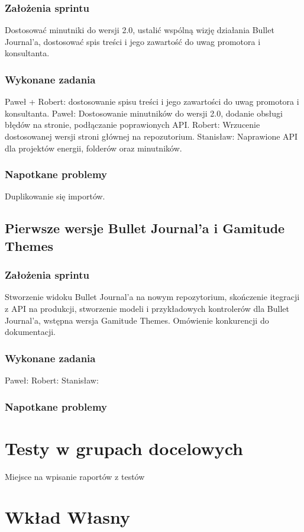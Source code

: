 \documentclass[a4paper,11pt]{report}
\begin{document}
\subsection {Założenia sprintu}
Dostosować minutniki do wersji 2.0, ustalić wspólną wizję działania Bullet Journal'a, dostosować spis treści i jego zawartość do uwag promotora i konsultanta.
\subsection {Wykonane zadania}
Paweł + Robert: dostosowanie spisu treści i jego zawartości do uwag promotora i konsultanta.
Paweł: Dostosowanie minutników do wersji 2.0, dodanie obsługi błędów na stronie, podłączanie poprawionych API.
Robert:  Wrzucenie dostosowanej wersji stroni głównej na repozutorium.
Stanisław: Naprawione API dla projektów energii, folderów oraz minutników.
\subsection {Napotkane problemy}
Duplikowanie się importów.

\section {Pierwsze wersje Bullet Journal'a i Gamitude Themes}
\subsection {Założenia sprintu}
Stworzenie widoku Bullet Journal'a na nowym repozytorium, skończenie itegracji z API na produkcji, stworzenie modeli i przykładowych kontrolerów dla Bullet Journal'a, wstępna wersja Gamitude Themes. Omówienie konkurencji do dokumentacji.
\subsection {Wykonane zadania}
Paweł: 
Robert: 
Stanisław:
\subsection {Napotkane problemy}


\chapter {Testy w grupach docelowych}
Miejsce na wpisanie raportów z testów

\chapter {Wkład Własny}
\end{document}
